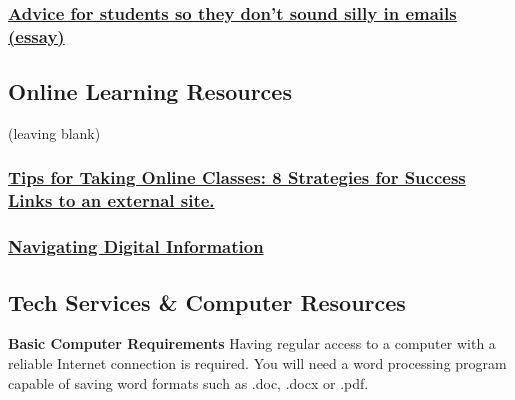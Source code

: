 \hypertarget{advice-for-students-so-they-dont-sound-silly-in-emails-essay}{%
\subsubsection{\texorpdfstring{\href{https://www.insidehighered.com/views/2015/04/16/advice-students-so-they-dont-sound-silly-emails-essay}{Advice for students so they don't sound silly in emails (essay)}}{Advice for students so they don't sound silly in emails (essay)}}\label{advice-for-students-so-they-dont-sound-silly-in-emails-essay}}

\hypertarget{online-learning-resources}{%
\subsection{Online Learning Resources}\label{online-learning-resources}}

(leaving blank)

\hypertarget{tips-for-taking-online-classes-8-strategies-for-success-links-to-an-external-site.}{%
\subsubsection{\texorpdfstring{\href{https://www.northeastern.edu/graduate/blog/tips-for-taking-online-classes/}{Tips for Taking Online Classes: 8 Strategies for Success Links to an external site.}}{Tips for Taking Online Classes: 8 Strategies for Success Links to an external site.}}\label{tips-for-taking-online-classes-8-strategies-for-success-links-to-an-external-site.}}

\hypertarget{navigating-digital-information}{%
\subsubsection{\texorpdfstring{\href{https://www.youtube.com/watch?v=pLlv2o6UfTU\&list=PL8dPuuaLjXtN07XYqqWSKpPrtNDiCHTzU}{Navigating Digital Information}}{Navigating Digital Information}}\label{navigating-digital-information}}

\hypertarget{tech-services-computer-resources}{%
\subsection{Tech Services \& Computer Resources}\label{tech-services-computer-resources}}

\textbf{Basic Computer Requirements}
Having regular access to a computer with a reliable Internet connection is required. You will need a word processing program capable of saving word formats such as .doc, .docx or .pdf.

